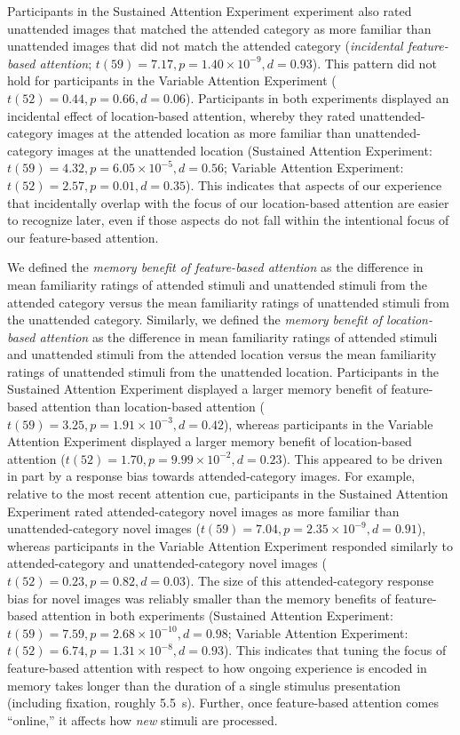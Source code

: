 \documentclass[english]{article}
\begin{document}
Participants in the Sustained Attention Experiment experiment also rated
unattended images that matched the attended category as more familiar than
unattended images that did not match the attended category (\textit{incidental
feature-based attention}; $t(59) = 7.17, p = 1.40 \times 10^{-9}, d = 0.93$).
This pattern did not hold for participants in the Variable Attention Experiment
($t(52) = 0.44, p = 0.66, d = 0.06$). Participants in both experiments
displayed an incidental effect of location-based attention, whereby they rated
unattended-category images at the attended location as more familiar than
unattended-category images at the unattended location (Sustained Attention
Experiment: $t(59) = 4.32, p = 6.05 \times 10^{-5}, d = 0.56$; Variable
Attention Experiment: $t(52) = 2.57, p = 0.01, d = 0.35$). This indicates that
aspects of our experience that incidentally overlap with the focus of our
location-based attention are easier to recognize later, even if those aspects
do not fall within the intentional focus of our feature-based attention.

We defined the \textit{memory benefit of feature-based attention} as the
difference in mean familiarity ratings of attended stimuli and unattended
stimuli from the attended category versus the mean familiarity ratings of
unattended stimuli from the unattended category. Similarly, we defined the
\textit{memory benefit of location-based attention} as the difference in mean
familiarity ratings of attended stimuli and unattended stimuli from the
attended location versus the mean familiarity ratings of unattended stimuli
from the unattended location. Participants in the Sustained Attention
Experiment displayed a larger memory benefit of feature-based attention than
location-based attention ($t(59) = 3.25, p = 1.91 \times 10^{-3}, d = 0.42$),
whereas participants in the Variable Attention Experiment displayed a larger
memory benefit of location-based attention ($t(52) = 1.70, p = 9.99 \times
10^{-2}, d = 0.23$). This appeared to be driven in part by a response bias
towards attended-category images. For example, relative to the most recent
attention cue, participants in the Sustained Attention Experiment rated
attended-category novel images as more familiar than unattended-category novel
images ($t(59) = 7.04, p = 2.35 \times 10^{-9}, d = 0.91$), whereas
participants in the Variable Attention Experiment responded similarly to
attended-category and unattended-category novel images ($t(52) = 0.23, p =
0.82, d = 0.03$). The size of this attended-category response bias for novel
images was reliably smaller than the memory benefits of feature-based attention
in both experiments (Sustained Attention Experiment: $t(59) = 7.59, p = 2.68
\times 10^{-10}, d = 0.98$; Variable Attention Experiment: $t(52) = 6.74, p =
1.31 \times 10^{-8}, d = 0.93$). This indicates that tuning the focus of
feature-based attention with respect to how ongoing experience is encoded in
memory takes longer than the duration of a single stimulus presentation
(including fixation, roughly 5.5~s). Further, once feature-based attention
comes ``online,'' it affects how \textit{new} stimuli are processed.
\end{document}
